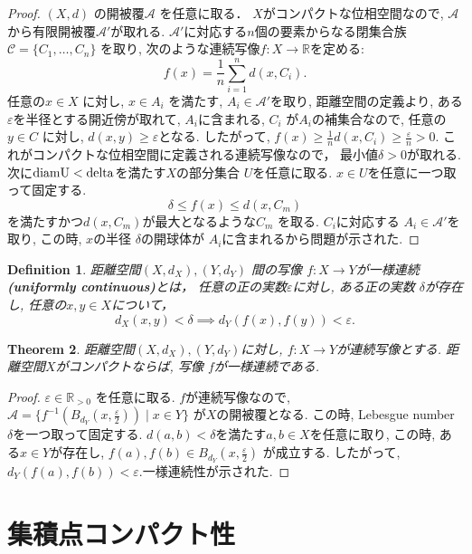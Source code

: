 \documentclass[dvipdfmx]{jbook}
\newtheorem{theorem}{Theorem}[section]
\newtheorem{definition}[theorem]{Definition}
\theoremstyle{remark}
\theoremstyle{plain}
\begin{document}
\begin{proof}
	$\left( X,d \right) $ の開被覆$\mathcal{A}$ を任意に取る．
	$X$がコンパクトな位相空間なので,  $\mathcal{A}$ から有限開被覆$\mathcal{A}'$が取れる. $\mathcal{A}'$に対応する$n$個の要素からなる閉集合族$\mathcal{C} = \{C_1, \ldots , C_{n}\} $ を取り, 次のような連続写像$f: X \to \mathbb{R}$を定める:
	\[
		f(x) = \frac{1}{n}\sum_{i =1}^n d(x,C_i)
	.\]
	任意の$x \in X $ に対し, 
	$x \in A_i$ を満たす, $A_i \in \mathcal{A}'$を取り, 
	距離空間の定義より, ある$\varepsilon$を半径とする開近傍が取れて,
	$A_i$に含まれる,
	$C_i$ が$A_i$の補集合なので, 
	任意の $y \in C$ に対し,  $d(x,y) \ge \varepsilon$となる. 
	したがって, 
	$f(x) \ge \frac{1}{n}d(x,C_i) \ge \frac{\varepsilon}{n}>0$.
	これがコンパクトな位相空間に定義される連続写像なので， 最小値$\delta >0$が取れる.
	次に$\rm{diam}U<delta$を満たす$X$の部分集合 $U$を任意に取る.  $x \in U$を任意に一つ取って固定する.
	 $$\delta \le f(x) \le d(x,C_m)$$
	  を満たすかつ$d(x,C_m)$が最大となるような$C_m$ を取る.
	  $C_i$に対応する $A_i \in \mathcal{A}'$を取り, この時, $x$の半径 $\delta$の開球体が $A_i$に含まれるから問題が示された.
\end{proof}

\begin{definition}
	距離空間$\left( X,d_X \right) , \left( Y, d_Y \right) $ 間の写像
	$f:X \to Y$が一様連続\textbf{(uniformly continuous)}とは，
	任意の正の実数$\varepsilon$に対し, 
	ある正の実数 $\delta$が存在し,
	任意の$x,y \in X$について，
	 \[
	 d_X(x,y) < \delta \implies d_Y(f(x),f(y))<\varepsilon
	 .\] 
\end{definition}

\begin{theorem}
	距離空間$\left( X,d_X \right) ,(Y,d_Y)$に対し, $f: X \to Y$が連続写像とする. 距離空間$X$がコンパクトならば, 写像 $f$が一様連続である.		
\end{theorem}

\begin{proof}
$\varepsilon \in \mathbb{R}_{>0}$ を任意に取る.
$f$が連続写像なので,
$\mathcal{A}=\{f^{-1}\left(B_{d_Y}(x , \frac{\varepsilon}{2})\right)  \mid x \in Y\} $ 
が$X$の開被覆となる. 
この時, Lebesgue number  $\delta$を一つ取って固定する. 
$d\left( a,b \right) < \delta $を満たす$a,b \in X$を任意に取り, 
この時, ある$x \in Y$が存在し,  
$f(a),f(b) \in B_{d_Y}(x, \frac{\varepsilon}{2})$ が成立する. 
したがって, $d_Y(f(a),f(b)) < \varepsilon$.一様連続性が示された.
\end{proof}

\section{集積点コンパクト性}
\end{document}
